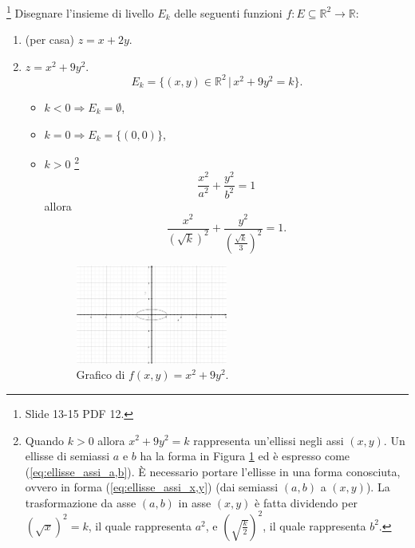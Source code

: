\begin{example}\footnote{Slide 13-15 PDF 12.}
    Disegnare l'insieme di livello $E_k$ delle seguenti funzioni $f\colon E\subseteq\mathbb R^2\rightarrow\mathbb R$:
    \begin{enumerate}
        \item (per casa) $z=x+2y$.
        \item $z=x^2+9y^2$.
        \begin{equation*}
            E_k=\{(x,y)\in\mathbb R^2\,|\,x^2+9y^2=k\}.
        \end{equation*}
        \begin{itemize}
            \item $k<0\Longrightarrow E_k=\emptyset$,
            \item $k=0 \Longrightarrow E_k=\{(0,0)\}$,
            \item $k>0$ \footnote{Quando $k>0$ allora $x^2+9y^2=k$ rappresenta un'ellissi negli assi $(x,y)$. Un ellisse di semiassi $a$ e $b$ ha la forma in Figura \ref{fig:esempio_ellisse} ed è espresso come (\ref{eq:ellisse_assi_a,b}). È necessario portare l'ellisse in una forma conosciuta, ovvero in forma (\ref{eq:ellisse_assi_x,y}) (dai semiassi $(a,b)$ a $(x,y)$). La trasformazione da asse $(a,b)$ in asse $(x,y)$ è fatta  dividendo per $(\sqrt{x})^2=k$, il quale rappresenta $a^2$, e $\left(\sqrt{\frac{k}{2}}\right)^2$, il quale rappresenta $b^2$.} 
            \begin{equation}\label{eq:ellisse_assi_a,b}
                \frac{x^2}{a^2}+\frac{y^2}{b^2}=1
            \end{equation}
            allora
            \begin{equation}\label{eq:ellisse_assi_x,y}
                \frac{x^2}{\left(\sqrt{k}\right)^2}+\frac{y^2}{\left(\frac{\sqrt{k}}{3}\right)^2}=1.
            \end{equation}
            \begin{figure}
            \centering
            \includegraphics[width=0.5\textwidth]{Analisi2/figures/esempio_ellisse.jpg}
                \caption{Grafico di $f(x,y)=x^2+9y^2$.}\label{fig:esempio_ellisse}

\end{figure}
\end{itemize}
\end{enumerate}
\end{example}

